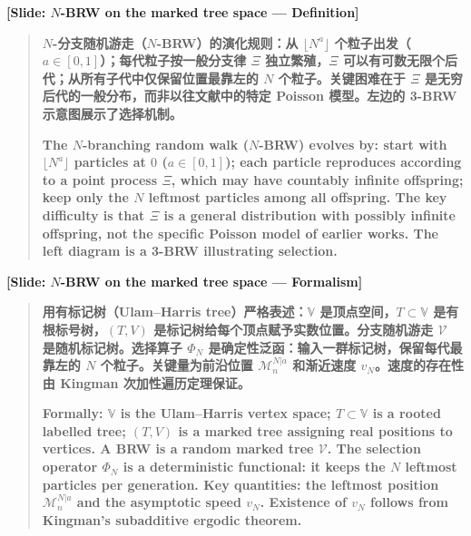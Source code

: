 \documentclass[12pt,a4paper]{article}
\begin{document}
\begin{center}
\color{blue!60!black}\textbf{[Slide: $N$-BRW on the marked tree space --- Definition]}
\end{center}

\begin{quote}
\textbf{$N$-分支随机游走（$N$-BRW）的演化规则：从 $\lfloor N^a\rfloor$ 个粒子出发（$a\in[0,1]$）；每代粒子按一般分支律 $\Xi$ 独立繁殖，$\Xi$ 可以有可数无限个后代；从所有子代中仅保留位置最靠左的 $N$ 个粒子。关键困难在于 $\Xi$ 是无穷后代的一般分布，而非以往文献中的特定 Poisson 模型。左边的 3-BRW 示意图展示了选择机制。}

\bigskip

\textbf{The $N$-branching random walk ($N$-BRW) evolves by: start with $\lfloor N^a\rfloor$ particles at $0$ ($a\in[0,1]$); each particle reproduces according to a point process $\Xi$, which may have countably infinite offspring; keep only the $N$ leftmost particles among all offspring. The key difficulty is that $\Xi$ is a general distribution with possibly infinite offspring, not the specific Poisson model of earlier works. The left diagram is a 3-BRW illustrating selection.}
\end{quote}

\begin{center}
\color{blue!60!black}\textbf{[Slide: $N$-BRW on the marked tree space --- Formalism]}
\end{center}

\begin{quote}
\textbf{用有标记树（Ulam--Harris tree）严格表述：$\mathbb V$ 是顶点空间，$T\subset\mathbb V$ 是有根标号树，$(T,V)$ 是标记树给每个顶点赋予实数位置。分支随机游走 $\mathcal V$ 是随机标记树。选择算子 $\Phi_N$ 是确定性泛函：输入一群标记树，保留每代最靠左的 $N$ 个粒子。关键量为前沿位置 $\mathcal M_n^{N|a}$ 和渐近速度 $v_N$。速度的存在性由 Kingman 次加性遍历定理保证。}

\bigskip

\textbf{Formally: $\mathbb V$ is the Ulam--Harris vertex space; $T\subset\mathbb V$ is a rooted labelled tree; $(T,V)$ is a marked tree assigning real positions to vertices. A BRW is a random marked tree $\mathcal V$. The selection operator $\Phi_N$ is a deterministic functional: it keeps the $N$ leftmost particles per generation. Key quantities: the leftmost position $\mathcal M_n^{N|a}$ and the asymptotic speed $v_N$. Existence of $v_N$ follows from Kingman's subadditive ergodic theorem.}
\end{quote}
\end{document}
